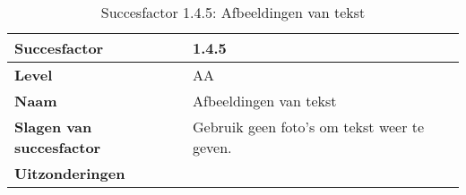 \begin{table}[H]
    \centering
    \caption{Succesfactor 1.4.5: Afbeeldingen van tekst}
    \hspace*{-1cm}\begin{tabular}{|l|p{12cm}|} 
        \hline
        \textbf{Succesfactor}                 & 1.4.5                                                                                                                                                                                                                                                                                                                                                                                                                                                                                                             \\ 
        \hline
        \textbf{Level}                        & AA                                                                                                                                                                                                                                                                                                                                                                                                                                                                                                                 \\ 
        \hline
        \textbf{Naam}                         & Afbeeldingen van tekst~                                                                                                                                                                                                                                                                                                                                                                                                                                                                                      \\ 
        \hline
        \textbf{Slagen van succesfactor}      & Gebruik geen foto's om tekst weer te geven.                                                                                                                                                                                                                                                                                                                                                            \\ 
         \hline
        \textbf{Uitzonderingen}     & 

\end{tabular}
\end{table}
